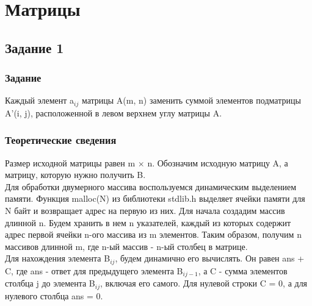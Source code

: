 \documentclass[12pt,a4paper]{report}
\begin{document}
\chapter{Матрицы}
\section{Задание 1}
\subsection{Задание}
Каждый элемент a$_{i j}$ матрицы A(m, n) заменить суммой элементов подматрицы A'(i, j), расположенной в левом верхнем углу матрицы A.
\subsection{Теоретические сведения}
Размер исходной матрицы равен m $\times$ n. Обозначим исходную матрицу A, а матрицу, которую нужно  получить B.\\
Для обработки двумерного массива воспользуемся динамическим выделением памяти. Функция malloc(N) из библиотеки stdlib.h выделяет ячейки памяти для N байт и возвращает адрес на первую из них. Для начала создадим массив длинной n. Будем хранить в нем n указателей, каждый из которых содержит адрес первой ячейки n-ого массива из m элементов. Таким образом, получим n массивов длинной m, где n-ый массив - n-ый столбец в матрице. \\
Для нахождения элемента B$_{i j}$, будем динамично его вычислять. Он равен ans + C, где ans - ответ для предыдущего элемента B$_{i j-1}$, а C - сумма элементов столбца j до элемента B$_{i j}$, включая его самого. Для нулевой строки C = 0, а для нулевого столбца ans = 0.
\end{document}
